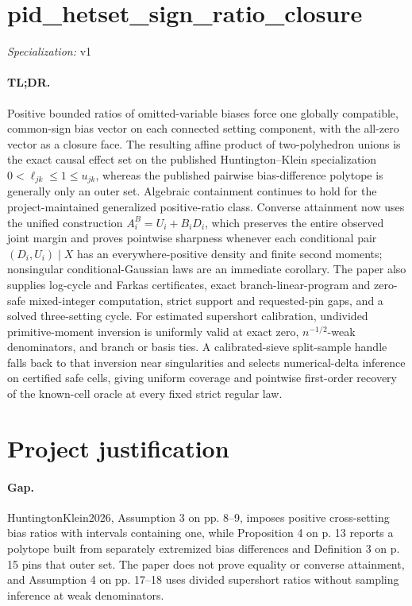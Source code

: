 \documentclass{article}
\begin{document}
\sloppy

\section*{pid\_\allowbreak{}hetset\_\allowbreak{}sign\_\allowbreak{}ratio\_\allowbreak{}closure}

\noindent\textit{Specialization:} v1\par

\paragraph{TL;DR.} Positive bounded ratios of omitted-variable biases force one globally compatible, common-sign bias vector on each connected setting component, with the all-zero vector as a closure face.  The resulting affine product of two-polyhedron unions is the exact causal effect set on the published Huntington--Klein specialization \(0<\ell_{jk}\le1\le u_{jk}\), whereas the published pairwise bias-difference polytope is generally only an outer set.  Algebraic containment continues to hold for the project-maintained generalized positive-ratio class.  Converse attainment now uses the unified construction \(A_i^B=U_i+B_iD_i\), which preserves the entire observed joint margin and proves pointwise sharpness whenever each conditional pair \((D_i,U_i)\mid X\) has an everywhere-positive density and finite second moments; nonsingular conditional-Gaussian laws are an immediate corollary.  The paper also supplies log-cycle and Farkas certificates, exact branch-linear-program and zero-safe mixed-integer computation, strict support and requested-pin gaps, and a solved three-setting cycle.  For estimated supershort calibration, undivided primitive-moment inversion is uniformly valid at exact zero, \(n^{-1/2}\)-weak denominators, and branch or basis ties.  A calibrated-sieve split-sample handle falls back to that inversion near singularities and selects numerical-delta inference on certified safe cells, giving uniform coverage and pointwise first-order recovery of the known-cell oracle at every fixed strict regular law.

\section{Project justification}

\paragraph{Gap.} HuntingtonKlein2026, Assumption 3 on pp. 8--9, imposes positive cross-setting bias ratios with intervals containing one, while Proposition 4 on p. 13 reports a polytope built from separately extremized bias differences and Definition 3 on p. 15 pins that outer set. The paper does not prove equality or converse attainment, and Assumption 4 on pp. 17--18 uses divided supershort ratios without sampling inference at weak denominators.
\end{document}
